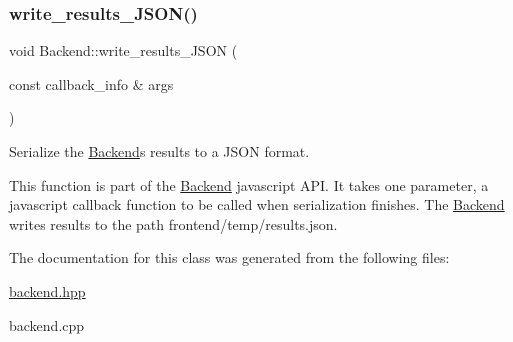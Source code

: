 \subsubsection{\texorpdfstring{write\+\_\+results\+\_\+\+J\+S\+O\+N()}{write\_results\_JSON()}}
{\footnotesize\ttfamily void Backend\+::write\+\_\+results\+\_\+\+J\+S\+ON (\begin{DoxyParamCaption}\item[{const callback\+\_\+info \&}]{args }\end{DoxyParamCaption})\hspace{0.3cm}{\ttfamily [static]}}



Serialize the \hyperlink{class_backend}{Backend}\textquotesingle{}s results to a J\+S\+ON format. 

This function is part of the \hyperlink{class_backend}{Backend} javascript A\+PI. It takes one parameter, a javascript callback function to be called when serialization finishes. The \hyperlink{class_backend}{Backend} writes results to the path frontend/temp/results.\+json. 

The documentation for this class was generated from the following files\+:\begin{DoxyCompactItemize}
\item 
\hyperlink{backend_8hpp}{backend.\+hpp}\item 
backend.\+cpp\end{DoxyCompactItemize}
